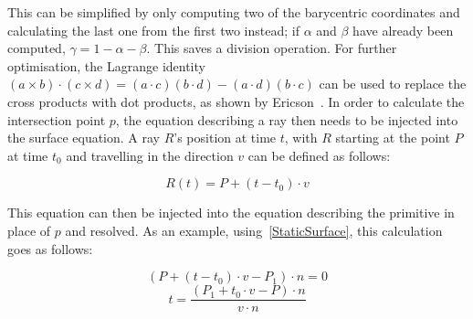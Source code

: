 This can be simplified by only computing two of the barycentric coordinates
and calculating the last one from the first two instead; if \(\alpha\) and \(\beta\) have already been computed,
\(\gamma = 1 - \alpha - \beta\). This saves a division operation.
For further optimisation, the Lagrange identity \((a \times b) \cdot (c \times d) = (a \cdot c)(b \cdot d) - (a \cdot d)(b \cdot c)\)
can be used to replace the cross products with dot products, as shown by Ericson~\cite{Er04}.
\newline
In order to calculate the intersection point \(p\), the equation describing a ray then needs to be injected into the surface equation.
A ray \(R\)'s position at time \(t\), with \(R\) starting at the point \(P\) at time \(t_0\)
and travelling in the direction \(v\) can be defined as follows:

\begin{equation}\label{RayEq}
    R(t) = P + (t - t_0) \cdot v
\end{equation}

This equation can then be injected into the equation describing the primitive in place of \(p\) and resolved.
As an example, using~\eqref{StaticSurface}, this calculation goes as follows:

\begin{equation*}
    (P + (t - t_0) \cdot v - P_1) \cdot n = 0
\end{equation*}
\begin{equation}\label{StaticSurfaceIntersect}
    t = \frac{(P_1 + t_0 \cdot v - P) \cdot n}{v \cdot n}
\end{equation}

